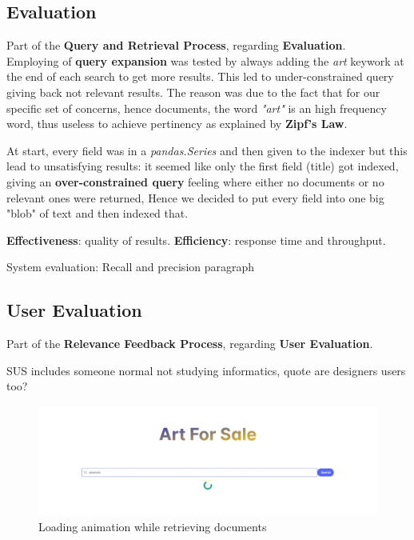 \documentclass[12pt]{spieman}  %
\begin{document}
\begin{spacing}{1}
    \section{Evaluation}\label{sec:evaluation}
    Part of the \textbf{Query and Retrieval Process}, regarding \textbf{Evaluation}.\\


    Employing of \textbf{query expansion} was tested by always adding the \textit{art} keywork
    at the end of each search to get more results.
    This led to under-constrained query giving back not relevant results.
    The reason was due to the fact that for our specific set of concerns, hence documents, the word
    \textit{"art"} is an high frequency word, thus useless to achieve pertinency as explained by
    \textbf{Zipf's Law}.

    At start, every field was in a \textit{pandas.Series} and then given to the indexer but this lead to
    unsatisfying results: it seemed like only the first field (title) got indexed,
    giving an \textbf{over-constrained query} feeling where either no documents or no relevant ones were returned,
    Hence we decided to put every field into one big "blob" of text and then indexed that.

    \textbf{Effectiveness}: quality of results. \textbf{Efficiency}: response time and throughput.

    System evaluation: Recall and precision paragraph

    \subsection{User Evaluation}
    Part of the \textbf{Relevance Feedback Process}, regarding \textbf{User Evaluation}.

    SUS includes someone normal not studying informatics, quote are designers users too?

    \begin{figure}[H]
        \centering
        \caption{Loading animation while retrieving documents}
        \label{fig:carousel}
        \includegraphics[width=\textwidth, trim={7cm 0cm 7cm 0cm}, clip]{figures/loading.jpeg}
    \end{figure}


\end{spacing}
\end{document}
